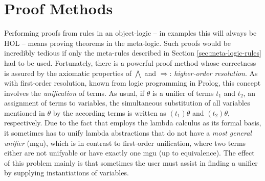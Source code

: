   

\section{Proof Methods}
\label{sec:proof-methods}

Performing proofs from rules in an object-logic -- in examples this will always
be HOL -- means proving theorems in the meta-logic. Such proofs would be
incredibly tedious if only the meta-rules described in Section
\ref{sec:meta-logic-rules} had to be used. Fortunately, there is a powerful
proof method whose correctness is assured by the axiomatic properties of $\bigwedge$ and
$\Longrightarrow$: \emph{higher-order resolution}. As with first-order resolution, known from
logic programming in Prolog, this concept involves the \emph{unification} of
terms. As usual, if $\theta$ is a unifier of terms $t_1$ and $t_2$, \IE an assignment
of terms to variables, the simultaneous substitution of all variables mentioned
in $\theta$ by the according terms is written as $(t_1)\theta$ and $(t_2)\theta$, respectively.
Due to the fact that \Isabelle employs the lambda calculus as its formal basis,
it sometimes has to unify lambda abstractions that do not have a \emph{most
  general unifier} (mgu), which is in contrast to first-order unification, where
two terms either are not unifyable or have exactly one mgu (up to equivalence).
The effect of this problem mainly is that sometimes the user must assist
\Isabelle in finding a unifier by supplying instantiations of variables.

